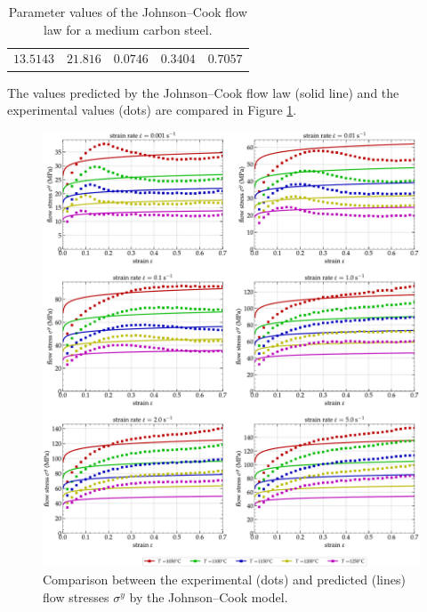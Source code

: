 \documentclass[metals,article,accept,pdftex,moreauthors]{Definitions/mdpi}
\begin{document}
\begin{table}[H]

\caption{Parameter values of the Johnson--Cook flow law for a medium carbon steel.}
\begin{tabularx}{\textwidth}{CCCCC}
\toprule
{} &  &  &  &  \\
\midrule
$13.5143$ & $21.816$ & $0.0746$ & $0.3404$ & $0.7057$ \\
\bottomrule
\end{tabularx}
\label{tab:JC}
\end{table}

The values predicted by the Johnson--Cook flow law (solid line) and the experimental values (dots) are compared in Figure \ref{fig:CompExp-JC-6}.
\begin{figure}[H]

\includegraphics[width=0.99\columnwidth]{Figures/CompExp-JC-6}
\caption{Comparison between the experimental (dots) and predicted (lines) flow stresses $\sigma^y$ by the Johnson--Cook model.}
\label{fig:CompExp-JC-6}
\end{figure}
\end{document}
